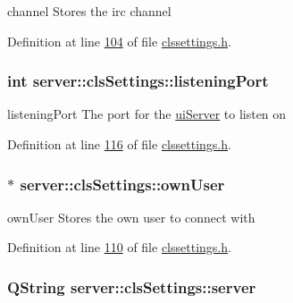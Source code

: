 channel Stores the irc channel 



Definition at line \hyperlink{custom_irc_server_2clssettings_8h_source_l00104}{104} of file \hyperlink{custom_irc_server_2clssettings_8h_source}{clssettings.\-h}.

\hypertarget{classserver_1_1cls_settings_a54004af066c09dc076417852f280cfa5}{
\subsubsection[{listening\-Port}]{\setlength{\rightskip}{0pt plus 5cm}int server\-::cls\-Settings\-::listening\-Port\hspace{0.3cm}{\ttfamily [private]}}}\label{d7/d81/classserver_1_1cls_settings_a54004af066c09dc076417852f280cfa5}


listening\-Port The port for the \hyperlink{classserver_1_1ui_server}{ui\-Server} to listen on 



Definition at line \hyperlink{custom_irc_server_2clssettings_8h_source_l00116}{116} of file \hyperlink{custom_irc_server_2clssettings_8h_source}{clssettings.\-h}.

\hypertarget{classserver_1_1cls_settings_af1cf9d75815351217ad046c926a23669}{
\subsubsection[{own\-User}]{$\ast$ server\-::cls\-Settings\-::own\-User\hspace{0.3cm}{\ttfamily [private]}}}\label{d7/d81/classserver_1_1cls_settings_af1cf9d75815351217ad046c926a23669}


own\-User Stores the own user to connect with 



Definition at line \hyperlink{custom_irc_server_2clssettings_8h_source_l00110}{110} of file \hyperlink{custom_irc_server_2clssettings_8h_source}{clssettings.\-h}.

\hypertarget{classserver_1_1cls_settings_a154a999eefd3fca39cf4d867f2d7ecaa}{
\subsubsection[{server}]{\setlength{\rightskip}{0pt plus 5cm}Q\-String server\-::cls\-Settings\-::server\hspace{0.3cm}{\ttfamily [private]}}}\label{d7/d81/classserver_1_1cls_settings_a154a999eefd3fca39cf4d867f2d7ecaa}


